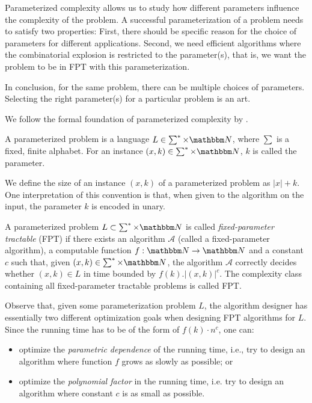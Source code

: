 Parameterized complexity allows us to study how different parameters influence the complexity of the problem.
A successful parameterization of a problem needs to satisfy two properties:
First, there should be specific reason for the choice of parameters for different applications.
Second, we need efficient algorithms where the combinatorial explosion is restricted to the parameter(s), that is, we want the problem to be in FPT with this parameterization.

In conclusion, for the same problem, there can be multiple choices of parameters. 
Selecting the right parameter(s) for a particular problem is an art.

We follow the formal foundation of parameterized complexity by \cite{cygan2015parameterized}.

\begin{definition}
 A parameterized problem is a language $L \in \sum^* \times \N$, where $\sum$ is a fixed, finite alphabet. For an instance $(x,k) \in \sum^* \times \N$, $k$ is called the parameter.
\end{definition}

We define the size of an instance $(x,k)$ of a parameterized problem as $|x| + k$. 
 One interpretation of this convention is that, when given to the algorithm on the input, the parameter $k$ is encoded in unary.


\begin{definition}
 A parameterized problem $L \subset \sum^* \times \N$ is called \textit{fixed-parameter tractable} (FPT) if there exists an algorithm $\mathcal{A}$ (called a fixed-parameter algorithm),
 a computable function $f: \N \rightarrow \N$ and a constant $c$ such that, given $(x,k) \in \sum^* \times \N$, the algorithm $\mathcal{A}$ correctly decides
 whether $(x,k) \in L$ in time bounded by $f(k). |(x,k)|^c$.
 The complexity class containing all fixed-parameter tractable problems is called FPT.
\end{definition}

Observe that, given some parameterization problem $L$, the algorithm designer has essentially two different optimization goals when designing FPT algorithms for $L$.
Since the running time has to be of the form of $f(k)\cdot n^c$, one can:
\begin{itemize}
 \item optimize the \textit{parametric dependence} of the running time, i.e., try to design an algorithm where function $f$ grows as slowly as possible; or
 \item optimize the \textit{polynomial factor} in the running time, i.e. try to design an algorithm where constant $c$ is as small as possible.
\end{itemize}

